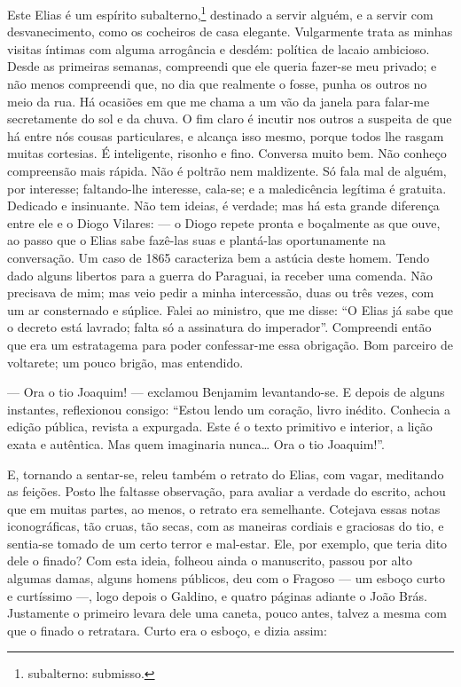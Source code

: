  Este Elias é um espírito subalterno,\footnote{subalterno:
  submisso.} destinado a servir alguém, e a servir com desvanecimento,
como os cocheiros de casa elegante. Vulgarmente trata as minhas visitas
íntimas com alguma arrogância e desdém: política de lacaio ambicioso.
Desde as primeiras semanas, compreendi que ele queria fazer-se meu
privado; e não menos compreendi que, no dia que realmente o fosse, punha
os outros no meio da rua. Há ocasiões em que me chama a um vão da janela
para falar-me secretamente do sol e da chuva. O fim claro é incutir nos
outros a suspeita de que há entre nós cousas particulares, e alcança
isso mesmo, porque todos lhe rasgam muitas cortesias. É inteligente,
risonho e fino. Conversa muito bem. Não conheço compreensão mais rápida.
Não é poltrão nem maldizente. Só fala mal de alguém, por interesse;
faltando-lhe interesse, cala-se; e a maledicência legítima é gratuita.
Dedicado e insinuante. Não tem ideias, é verdade; mas há esta grande
diferença entre ele e o Diogo Vilares: --- o Diogo repete pronta e
boçalmente as que ouve, ao passo que o Elias sabe fazê-las suas e
plantá-las oportunamente na conversação. Um caso de 1865 caracteriza bem
a astúcia deste homem. Tendo dado alguns libertos para a guerra do
Paraguai, ia receber uma comenda. Não precisava de mim; mas veio pedir a
minha intercessão, duas ou três vezes, com um ar consternado e súplice.
Falei ao ministro, que me disse: ``O Elias já sabe que o decreto está
lavrado; falta só a assinatura do imperador''. Compreendi então que era
um estratagema para poder confessar-me essa obrigação. Bom parceiro de
voltarete; um pouco brigão, mas entendido.

--- Ora o tio Joaquim! --- exclamou Benjamim levantando-se. E depois de
alguns instantes, reflexionou consigo: ``Estou lendo um coração, livro
inédito. Conhecia a edição pública, revista a expurgada. Este é o texto
primitivo e interior, a lição exata e autêntica. Mas quem imaginaria
nunca\ldots{} Ora o tio Joaquim!''.

E, tornando a sentar-se, releu também o retrato do Elias, com vagar,
meditando as feições. Posto lhe faltasse observação, para avaliar a
verdade do escrito, achou que em muitas partes, ao menos, o retrato era
semelhante. Cotejava essas notas iconográficas, tão cruas, tão secas,
com as maneiras cordiais e graciosas do tio, e sentia-se tomado de um
certo terror e mal-estar. Ele, por exemplo, que teria dito dele o
finado? Com esta ideia, folheou ainda o manuscrito, passou por alto
algumas damas, alguns homens públicos, deu com o Fragoso --- um esboço
curto e curtíssimo ---, logo depois o Galdino, e quatro páginas adiante
o João Brás. Justamente o primeiro levara dele uma caneta, pouco antes,
talvez a mesma com que o finado o retratara. Curto era o esboço, e dizia
assim:

